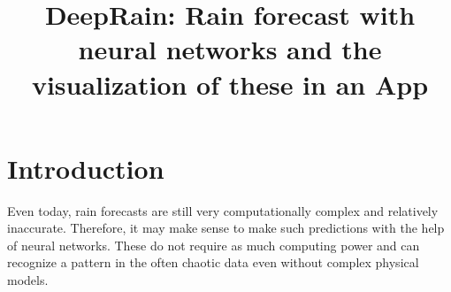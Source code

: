 \documentclass[oneside]{htwg-report}
\begin{document}



\newcommand{\verfasserA}{Simon Christofzik}
\newcommand{\verfasserB}{Paul Sutter}
\newcommand{\verfasserC}{Till Reitlinger}
\newcommand{\thema}{DeepRain: Rain forecast with neural networks and the visualization of these in an App}
\newcommand{\hoschschule}{HTWG Konstanz - University of Applied Sciences}
\newcommand{\institut}{HTWG Konstanz - Institute for Optical Systems}
\newcommand{\prueferA}{Prof. Dr. Oliver Dürr}


\title[Teamprojektthema]{\thema}


\makecover[]


\twocolumn
\section*{Introduction}
    \begin{sloppypar}
        Even today, rain forecasts are still very computationally complex and relatively inaccurate. 
        Therefore, it may make sense to make such predictions with the help of neural networks. 
        These do not require as much computing power and can recognize a pattern in the often chaotic data even without complex physical models.
    \end{sloppypar}
\end{document}
